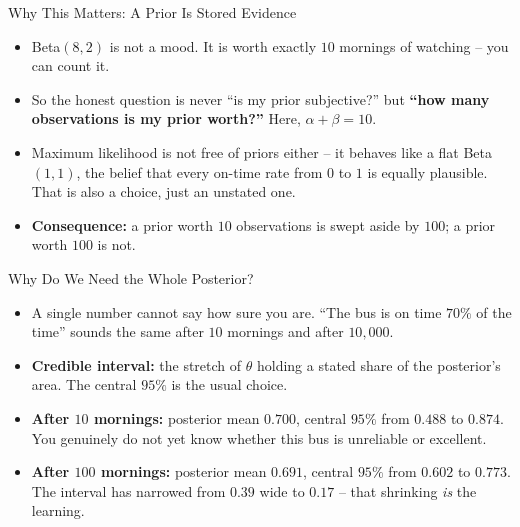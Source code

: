 \begin{frame}{Why This Matters: A Prior Is Stored Evidence}
\begin{itemize}
  \item Beta$(8,2)$ is not a mood. It is worth exactly $10$ mornings of watching -- you can count it.
  \pause
  \item So the honest question is never ``is my prior subjective?'' but \textbf{``how many observations is my prior worth?''} Here, $\alpha + \beta = 10$.
  \pause
  \item Maximum likelihood is not free of priors either -- it behaves like a flat Beta$(1,1)$, the belief that every on-time rate from $0$ to $1$ is equally plausible. That is also a choice, just an unstated one.
  \pause
  \item \textbf{Consequence:} a prior worth $10$ observations is swept aside by $100$; a prior worth $100$ is not.
\end{itemize}
\end{frame}

\begin{frame}{Why Do We Need the Whole Posterior?}
\begin{itemize}
  \item A single number cannot say how sure you are. ``The bus is on time $70\%$ of the time'' sounds the same after $10$ mornings and after $10{,}000$.
  \pause
  \item \textbf{Credible interval:} the stretch of $\theta$ holding a stated share of the posterior's area. The central $95\%$ is the usual choice.
  \pause
  \item \textbf{After $10$ mornings:} posterior mean $0.700$, central $95\%$ from $\mathbf{0.488}$ to $\mathbf{0.874}$. You genuinely do not yet know whether this bus is unreliable or excellent.
  \pause
  \item \textbf{After $100$ mornings:} posterior mean $0.691$, central $95\%$ from $\mathbf{0.602}$ to $\mathbf{0.773}$. The interval has narrowed from $0.39$ wide to $0.17$ -- that shrinking \emph{is} the learning.
\end{itemize}
\end{frame}

